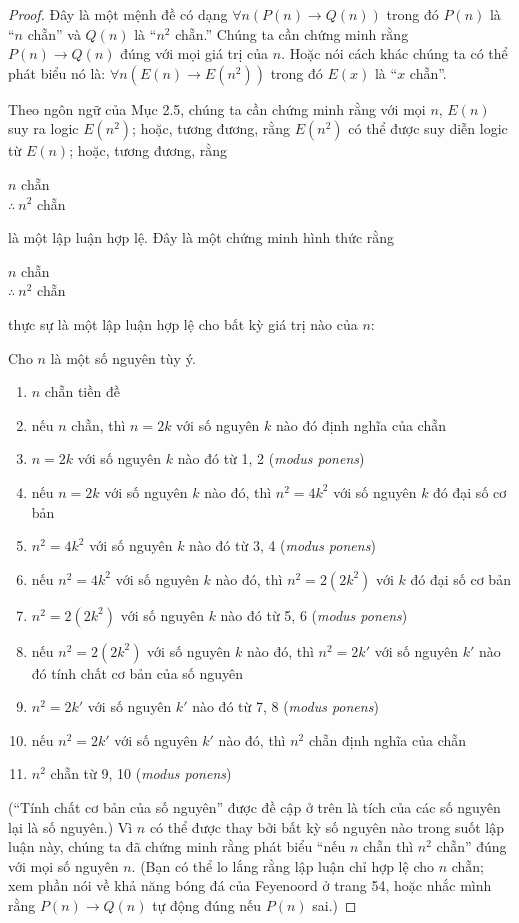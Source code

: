 \begin{proof}
Đây là một mệnh đề có dạng $\forall n(P(n) \to Q(n))$ trong đó $P(n)$ là ``$n$ chẵn'' và $Q(n)$ là ``$n^2$ chẵn.'' Chúng ta cần chứng minh rằng $P(n) \to Q(n)$ đúng với mọi giá trị của $n$. Hoặc nói cách khác chúng ta có thể phát biểu nó là: $\forall n(E(n) \to E(n^2))$ trong đó $E(x)$ là ``$x$ chẵn''.

Theo ngôn ngữ của Mục 2.5, chúng ta cần chứng minh rằng với mọi $n$, $E(n)$ suy ra logic $E(n^2)$; hoặc, tương đương, rằng $E(n^2)$ có thể được suy diễn logic từ $E(n)$; hoặc, tương đương, rằng
\begin{center}
$n$ chẵn\\
$\therefore\ n^2$ chẵn
\end{center}
là một lập luận hợp lệ. Đây là một chứng minh hình thức rằng
\begin{center}
$n$ chẵn\\
$\therefore\ n^2$ chẵn
\end{center}
thực sự là một lập luận hợp lệ cho bất kỳ giá trị nào của $n$:

Cho $n$ là một số nguyên tùy ý.
\begin{enumerate}
\item $n$ chẵn \hfill tiền đề
\item nếu $n$ chẵn, thì $n = 2k$ với số nguyên $k$ nào đó \hfill định nghĩa của chẵn
\item $n = 2k$ với số nguyên $k$ nào đó \hfill từ 1, 2 (\emph{modus ponens})
\item nếu $n = 2k$ với số nguyên $k$ nào đó, thì $n^2 = 4k^2$ với số nguyên $k$ đó \hfill đại số cơ bản
\item $n^2 = 4k^2$ với số nguyên $k$ nào đó \hfill từ 3, 4 (\emph{modus ponens})
\item nếu $n^2 = 4k^2$ với số nguyên $k$ nào đó, thì $n^2 = 2(2k^2)$ với $k$ đó \hfill đại số cơ bản
\item $n^2 = 2(2k^2)$ với số nguyên $k$ nào đó \hfill từ 5, 6 (\emph{modus ponens})
\item nếu $n^2 = 2(2k^2)$ với số nguyên $k$ nào đó, thì $n^2 = 2k'$ với số nguyên $k'$ nào đó \hfill tính chất cơ bản của số nguyên
\item $n^2 = 2k'$ với số nguyên $k'$ nào đó \hfill từ 7, 8 (\emph{modus ponens})
\item nếu $n^2 = 2k'$ với số nguyên $k'$ nào đó, thì $n^2$ chẵn \hfill định nghĩa của chẵn
\item $n^2$ chẵn \hfill từ 9, 10 (\emph{modus ponens})
\end{enumerate}

(``Tính chất cơ bản của số nguyên'' được đề cập ở trên là tích của các số nguyên lại là số nguyên.) Vì $n$ có thể được thay bởi bất kỳ số nguyên nào trong suốt lập luận này, chúng ta đã chứng minh rằng phát biểu ``nếu $n$ chẵn thì $n^2$ chẵn'' đúng với mọi số nguyên $n$. (Bạn có thể lo lắng rằng lập luận chỉ hợp lệ cho $n$ chẵn; xem phần nói về khả năng bóng đá của Feyenoord ở trang 54, hoặc nhắc mình rằng $P(n) \to Q(n)$ tự động đúng nếu $P(n)$ sai.)
\end{proof}

